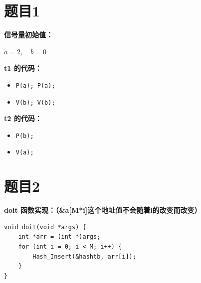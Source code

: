 \documentclass[fleqn]{ctexart}
\begin{document}
\section*{题目1}

\noindent \textbf{信号量初始值：}

$a = 2, \quad b = 0$

\vspace{1em}

\textbf{t1 的代码：}
\begin{itemize}
    \item [{[1]}] \verb|P(a); P(a);| 
    \item [{[2]}] \verb|V(b); V(b);| 
\end{itemize}

\textbf{t2 的代码：}
\begin{itemize}
    \item [{[1]}] \verb|P(b);| 
    \item [{[2]}] \verb|V(a);| 
\end{itemize}

\section*{题目2}

\textbf{doit 函数实现：（\&a[M*i]这个地址值不会随着i的改变而改变）}
\begin{verbatim}
void doit(void *args) {
    int *arr = (int *)args;
    for (int i = 0; i < M; i++) {
        Hash_Insert(&hashtb, arr[i]);
    }
}
\end{verbatim}
\end{document}
